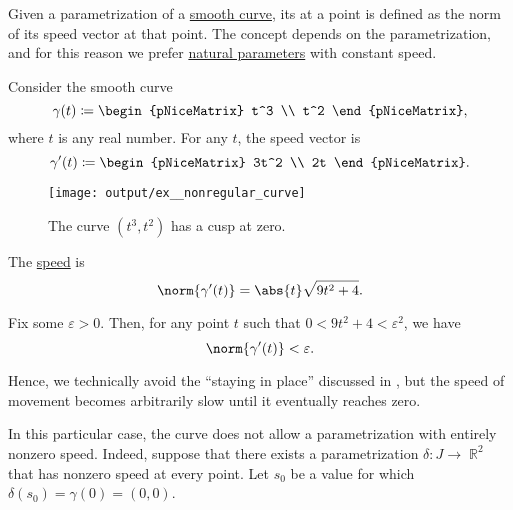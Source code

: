 \begin{definition}\label{def:curve_speed}
  Given a parametrization of a \hyperref[def:smooth_curve]{smooth curve}, its  at a point is defined as the norm of its speed vector at that point. The concept depends on the parametrization, and for this reason we prefer \hyperref[thm:natural_parametrization_existence]{natural parameters} with constant speed.
\end{definition}

\begin{example}\label{ex:nonregular_curve}
  Consider the smooth curve
  \begin{equation*}
    \gamma(t)
    \coloneqq
    \begin{pNiceMatrix}
      t^3 \\ t^2
    \end{pNiceMatrix},
  \end{equation*}
  where \( t \) is any real number. For any \( t \), the speed vector is
  \begin{equation*}
    \gamma'(t)
    \coloneqq
    \begin{pNiceMatrix}
      3t^2 \\ 2t
    \end{pNiceMatrix}.
  \end{equation*}

  \begin{figure}[!ht]
    \centering
    \texttt{[image: output/ex\_\_nonregular\_curve]}
    \caption{The curve \( (t^3, t^2) \) has a cusp at zero.}\label{fig:ex:nonregular_curve}
  \end{figure}

  The \hyperref[def:curve_speed]{speed} is
  \begin{equation*}
    \norm{\gamma'(t)} = \abs{t} \sqrt{9 t^2 + 4}.
  \end{equation*}

  Fix some \( \varepsilon > 0 \). Then, for any point \( t \) such that \( 0 < 9 t^2 + 4 < \varepsilon^2 \), we have
  \begin{equation*}
    \norm{\gamma'(t)} < \varepsilon.
  \end{equation*}

  Hence, we technically avoid the \enquote{staying in place} discussed in , but the speed of movement becomes arbitrarily slow until it eventually reaches zero.

  In this particular case, the curve does not allow a parametrization with entirely nonzero speed. Indeed, suppose that there exists a parametrization \( \delta: J \to \BbbR^2 \) that has nonzero speed at every point. Let \( s_0 \) be a value for which \( \delta(s_0) = \gamma(0) = (0, 0) \).


\end{example}
